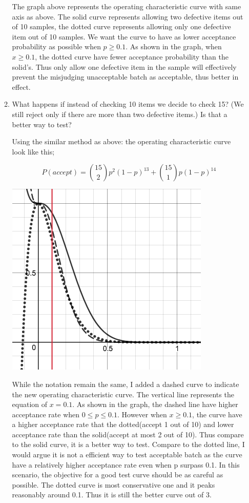 \documentclass[11pt, oneside]{article}
\begin{document}
\begin{enumerate}
\begin{enumerate}
\begin{center}
        \end{center}
        The graph above represents the operating characteristic curve with same axis as above. The solid curve represents allowing two defective items out of 10 samples, the dotted curve represents allowing only one defective item out of 10 samples. We want the curve to have as lower acceptance probability as possible when $p\geq 0.1$. As shown in the graph, when $x\geq 0.1$, the dotted curve have fewer acceptance probability than the solid's. Thus only allow one defective item in the sample will effectively prevent the misjudging unacceptable batch as acceptable, thus better in effect. 
        \item What happens if instead of checking 10 items we decide to check 15?
        (We still reject only if there are more than two defective items.) Is that
        a better way to test?
        
        Using the similar method as above: the operating characteristic curve look like this;
        
        \[P(accept)= {15\choose 2}p^2(1-p)^13+{15\choose 1}p(1-p)^14\]
        
        \begin{center}
        \includegraphics[scale=0.3]{905}
        \end{center}
        
        While the notation remain the same, I added a dashed curve to indicate the new operating characteristic curve. The vertical line represents the equation of $x=0.1$. As shown in the graph, the dashed line have higher acceptance rate when $0\leq p \leq 0.1$. However when $x\geq0.1$, the curve have a higher acceptance rate that the dotted(accept 1 out of 10) and lower acceptance rate than the solid(accept at most 2 out of 10). Thus compare to the solid curve, it is a better way to test. Compare to the dotted line, I would argue it is not a efficient way to test acceptable batch as the curve have a relatively higher acceptance rate even when p surpass 0.1. In this scenario, the objective for a good test curve should be as careful as possible. The dotted curve is  most conservative one and it peaks reasonably around 0.1. Thus it is still the better curve out of 3.
    \end{enumerate}
    

\end{enumerate}
\end{document}
